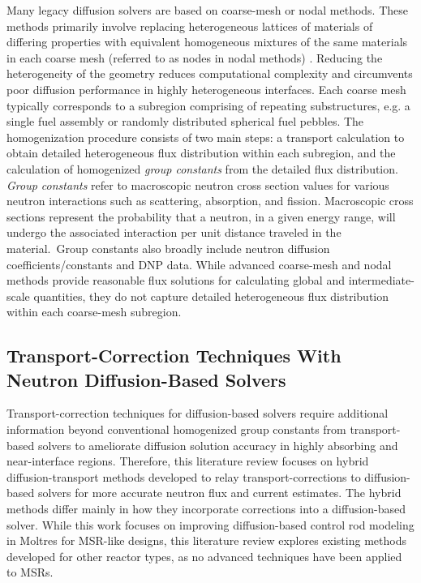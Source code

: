 Many legacy diffusion solvers are based on coarse-mesh or nodal methods. These methods
primarily involve replacing heterogeneous lattices of materials of differing properties with
equivalent homogeneous mixtures of the same materials in each coarse mesh (referred to as nodes in
nodal methods) \cite{stacey_nuclear_2007}. Reducing the heterogeneity of the geometry reduces
computational complexity and circumvents poor diffusion performance in highly heterogeneous
interfaces. Each coarse mesh typically corresponds to a subregion comprising of repeating
substructures, e.g. a single fuel assembly or randomly distributed spherical fuel pebbles. The
homogenization procedure consists of two main steps: a transport calculation to obtain detailed
heterogeneous flux distribution within each subregion, and the calculation of homogenized
\textit{group constants} from the detailed flux distribution. \textit{Group constants} refer to
macroscopic neutron cross section values for various neutron interactions such as
scattering, absorption, and fission. Macroscopic cross sections represent the probability that a
neutron, in a given energy range, will undergo the associated interaction per unit distance
traveled in the material.\ Group constants also broadly include neutron diffusion
coefficients/constants and \gls{DNP} data. While advanced coarse-mesh and nodal
methods provide reasonable flux solutions for calculating global and intermediate-scale quantities,
they do not capture detailed heterogeneous flux distribution within each coarse-mesh subregion.

\subsection{Transport-Correction Techniques With Neutron Diffusion-Based Solvers}
\label{sec:lit-tc}

Transport-correction techniques for diffusion-based solvers require additional information beyond
conventional homogenized group constants from transport-based solvers to ameliorate diffusion
solution accuracy in highly absorbing and near-interface regions.
Therefore, this literature review focuses on hybrid diffusion-transport methods developed to relay
transport-corrections to diffusion-based solvers for more accurate neutron flux and current
estimates. The hybrid methods differ mainly in how they incorporate corrections into a
diffusion-based solver. While this work focuses on improving diffusion-based control rod
modeling in Moltres for \gls{MSR}-like designs, this literature review explores existing methods
developed for other reactor types, as no advanced techniques have been applied to \glspl{MSR}.

